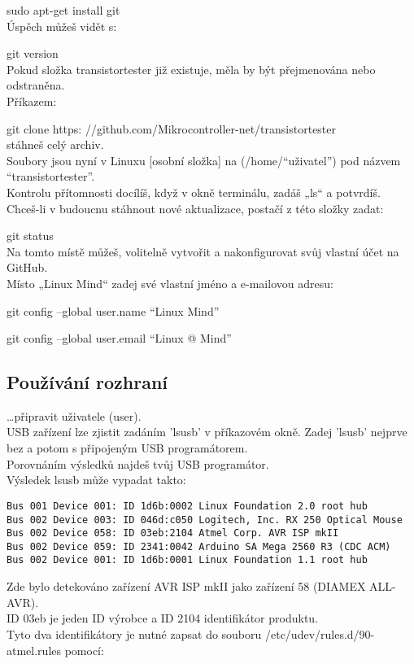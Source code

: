 sudo apt-get install git\\
Úspěch můžeš vidět s:

git version\\
Pokud složka transistortester již existuje, měla by být přejmenována nebo odstraněna. \\
Příkazem:

git clone https: //github.com/Mikrocontroller-net/transistortester \\
stáhneš celý archiv. \\
Soubory jsou nyní v Linuxu [osobní složka] na (/home/"`uživatel"') pod názvem "`transistortester"'.\\
Kontrolu přítomnosti docílíš, když v okně terminálu, zadáš „ls“ a potvrdíš. \\
Chceš-li v budoucnu stáhnout nové aktualizace, postačí z této složky zadat:

git status\\
Na tomto místě můžeš, volitelně vytvořit a nakonfigurovat svůj vlastní účet na GitHub. \\
Místo „Linux Mind“ zadej své vlastní jméno a e-mailovou adresu:

git config --global user.name "`Linux Mind"'
 
git config --global user.email "`Linux @ Mind"' 
\vspace*{-0.3cm}
\subsection{Používání rozhraní}
\vspace*{-0.3cm}
\dots připravit uživatele (user). \\
USB zařízení lze zjistit zadáním 'lsusb' v příkazovém okně.
Zadej 'lsusb' nejprve bez a potom s připojeným USB programátorem. \\
Porovnáním výsledků najdeš tvůj USB programátor.
~ \\
Výsledek lsusb může vypadat takto:
\vspace*{-0.3cm}
\begin{verbatim}
Bus 001 Device 001: ID 1d6b:0002 Linux Foundation 2.0 root hub
Bus 002 Device 003: ID 046d:c050 Logitech, Inc. RX 250 Optical Mouse
Bus 002 Device 058: ID 03eb:2104 Atmel Corp. AVR ISP mkII
Bus 002 Device 059: ID 2341:0042 Arduino SA Mega 2560 R3 (CDC ACM)
Bus 002 Device 001: ID 1d6b:0001 Linux Foundation 1.1 root hub
\end{verbatim}
\vspace*{-0.3cm}
Zde bylo detekováno zařízení AVR ISP mkII jako zařízení 58 (DIAMEX ALL-AVR).\\
ID 03eb je jeden ID výrobce a ID 2104 identifikátor produktu.\\
Tyto dva identifikátory je nutné zapsat do souboru /etc/udev/rules.d/90-atmel.rules pomocí:

